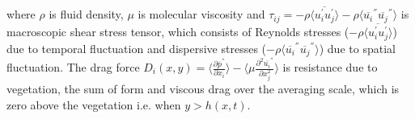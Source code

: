 \documentclass[12pt]{report}   %
\renewcommand{\bar}{\overline}
\begin{document}
 where $\rho$ is fluid density, $\mu$ is molecular viscosity and 
 $\tau_{ij}=-\rho \langle \overline{u_i^{'} u_j^{'}} \rangle  -\rho \langle{ \overline{u_i}^{''} \overline{u_j}^{''} } \rangle  $ is macroscopic shear stress tensor, which consists of Reynolds stresses ($ -\rho \langle \overline {u_i^{'} u_j^{'}} \rangle $) due to temporal fluctuation and dispersive stresses ($ -\rho \langle{ \overline{u_i}^{''} \overline{u_j}^{''} } \rangle $) due to spatial fluctuation. The drag force $D_i(x,y) = \langle \frac{\partial \overline{p}^{''}}{\partial x_i} \rangle - \langle \mu \frac{\partial^2 \bar{u_i}^{''} }{\partial x_j^2} \rangle $ is resistance due to vegetation, the sum of form and viscous drag over the averaging scale, which is zero above the vegetation i.e.  when $y>h(x,t)$. 
 
\end{document}
